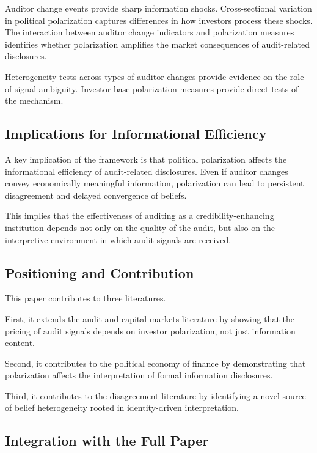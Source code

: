 Auditor change events provide sharp information shocks. Cross-sectional variation in political polarization captures differences in how investors process these shocks. The interaction between auditor change indicators and polarization measures identifies whether polarization amplifies the market consequences of audit-related disclosures.

Heterogeneity tests across types of auditor changes provide evidence on the role of signal ambiguity. Investor-base polarization measures provide direct tests of the mechanism.

\subsection{Implications for Informational Efficiency}

A key implication of the framework is that political polarization affects the informational efficiency of audit-related disclosures. Even if auditor changes convey economically meaningful information, polarization can lead to persistent disagreement and delayed convergence of beliefs.

This implies that the effectiveness of auditing as a credibility-enhancing institution depends not only on the quality of the audit, but also on the interpretive environment in which audit signals are received.

\subsection{Positioning and Contribution}

This paper contributes to three literatures.

First, it extends the audit and capital markets literature by showing that the pricing of audit signals depends on investor polarization, not just information content.

Second, it contributes to the political economy of finance by demonstrating that polarization affects the interpretation of formal information disclosures.

Third, it contributes to the disagreement literature by identifying a novel source of belief heterogeneity rooted in identity-driven interpretation.

\subsection{Integration with the Full Paper}

